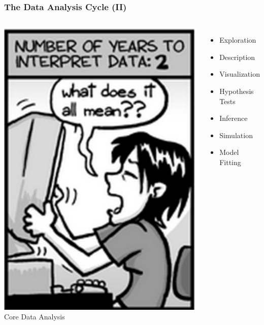 \documentclass{beamer}
\begin{document}
\begin{frame}
\frametitle{The Data Analysis Cycle (II)}
\begin{columns}
    \hspace*{1cm}
    \includegraphics[scale=0.4]{./figures/im2.png}
    Core Data Analysis  
    \begin{itemize}
    \item[] Exploration
    \item[] Description
    \item[] Visualization
    \item[] Hypothesis Tests
    \item[] Inference
    \item[] Simulation
    \item[] Model Fitting
    \end{itemize}
\end{columns}
\end{frame}
\end{document}
